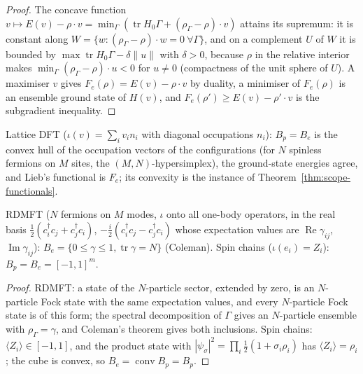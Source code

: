 \begin{proof}
  \leanok
  The concave function $v\mapsto E(v)-\rho\cdot v=\min_\Gamma(\operatorname{tr}H_0\Gamma+(\rho_\Gamma-\rho)\cdot v)$ attains its supremum: it is
  constant along $W=\{w:(\rho_\Gamma-\rho)\cdot w=0\ \forall\Gamma\}$, and on a complement $U$ of $W$ it is bounded by $\max\operatorname{tr}H_0\Gamma-\delta\|u\|$
  with $\delta>0$, because $\rho$ in the relative interior makes $\min_\Gamma(\rho_\Gamma-\rho)\cdot u<0$ for $u\ne0$ (compactness of the unit sphere
  of $U$). A maximiser $v$ gives $F_e(\rho)=E(v)-\rho\cdot v$ by duality, a minimiser of $F_e(\rho)$ is an ensemble ground state of $H(v)$, and
  $F_e(\rho')\ge E(v)-\rho'\cdot v$ is the subgradient inequality.
\end{proof}

\begin{theorem}\label{thm:scope-instance-lattice}
  \leanok
  Lattice DFT ($\iota(v)=\sum_iv_in_i$ with diagonal occupations $n_i$): $B_p=B_e$ is the convex hull of the occupation vectors of the
  configurations (for $N$ spinless fermions on $M$ sites, the $(M,N)$-hypersimplex), the ground-state energies agree, and Lieb's
  functional is $F_e$; its convexity is the instance of Theorem~\ref{thm:scope-functionals}.
\end{theorem}

\begin{theorem}\label{thm:scope-instances}
  \leanok
  RDMFT ($N$ fermions on $M$ modes, $\iota$ onto all one-body operators, in the real basis
  $\tfrac12(c_i^\dagger c_j+c_j^\dagger c_i)$, $-\tfrac i2(c_i^\dagger c_j-c_j^\dagger c_i)$ whose expectation values are $\operatorname{Re}\gamma_{ij}$,
  $\operatorname{Im}\gamma_{ij}$): $B_e=\{0\le\gamma\le1,\operatorname{tr}\gamma=N\}$ (Coleman). Spin chains ($\iota(e_i)=Z_i$):
  $B_p=B_e=[-1,1]^m$.
\end{theorem}

\begin{proof}
  \leanok
  RDMFT: a state of the $N$-particle sector, extended by zero, is an $N$-particle Fock state with the same expectation values, and
  every $N$-particle Fock state is of this form; the spectral decomposition of $\Gamma$ gives an $N$-particle ensemble with
  $\rho_\Gamma=\gamma$, and Coleman's theorem gives both inclusions. Spin chains: $\langle Z_i\rangle\in[-1,1]$, and the product state with
  $|\psi_\sigma|^2=\prod_i\tfrac12(1+\sigma_i\rho_i)$ has $\langle Z_i\rangle=\rho_i$; the cube is convex, so $B_e=\operatorname{conv}B_p=B_p$.
\end{proof}

